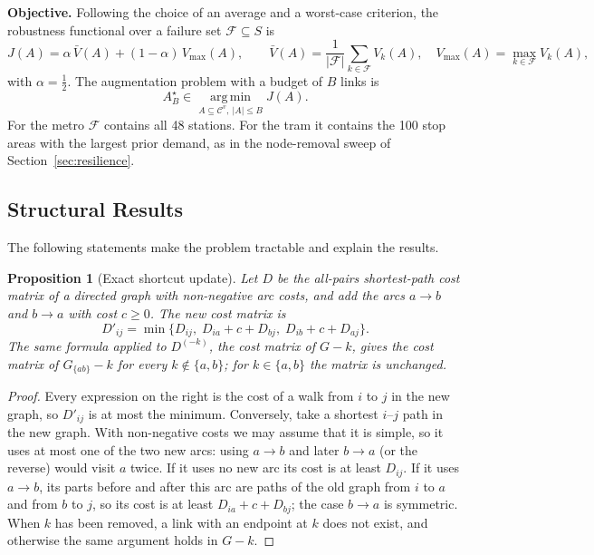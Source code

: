 \documentclass[12pt,a4paper]{article}
\theoremstyle{plain}
\newtheorem{proposition}[theorem]{Proposition}
\theoremstyle{definition}
\theoremstyle{remark}
\begin{document}
\textbf{Objective.}  Following the choice of an average and a worst-case
criterion, the robustness functional over a failure set $\mathcal F\subseteq S$
is
\begin{equation}
  J(A)=\alpha\,\bar V(A)+(1-\alpha)\,V_{\max}(A),\qquad
  \bar V(A)=\frac{1}{|\mathcal F|}\sum_{k\in\mathcal F}V_k(A),\quad
  V_{\max}(A)=\max_{k\in\mathcal F}V_k(A),
  \label{eq:J}
\end{equation}
with $\alpha=\tfrac12$.  The augmentation problem with a budget of $B$ links is
\begin{equation}
  A^\star_B\in\operatorname*{arg\,min}_{A\subseteq\mathcal C^v,\ |A|\le B} J(A).
  \label{eq:augprob}
\end{equation}
For the metro $\mathcal F$ contains all 48 stations.  For the tram it contains
the 100 stop areas with the largest prior demand, as in the node-removal sweep
of Section~\ref{sec:resilience}.

\subsection{Structural Results}

The following statements make the problem tractable and explain the results.

\begin{proposition}[Exact shortcut update]
\label{prop:shortcut}
Let $D$ be the all-pairs shortest-path cost matrix of a directed graph with
non-negative arc costs, and add the arcs $a\to b$ and $b\to a$ with cost
$c\ge0$.  The new cost matrix is
\begin{equation}
  D'_{ij}=\min\bigl\{D_{ij},\;D_{ia}+c+D_{bj},\;D_{ib}+c+D_{aj}\bigr\}.
  \label{eq:shortcut}
\end{equation}
The same formula applied to $D^{(-k)}$, the cost matrix of $G-k$, gives the cost
matrix of $G_{\{ab\}}-k$ for every $k\notin\{a,b\}$; for $k\in\{a,b\}$ the matrix
is unchanged.
\end{proposition}

\begin{proof}
Every expression on the right is the cost of a walk from $i$ to $j$ in the new
graph, so $D'_{ij}$ is at most the minimum.  Conversely, take a shortest
$i$--$j$ path in the new graph.  With non-negative costs we may assume that it
is simple, so it uses at most one of the two new arcs: using $a\to b$ and later
$b\to a$ (or the reverse) would visit $a$ twice.  If it uses no new arc its cost
is at least $D_{ij}$.  If it uses $a\to b$, its parts before and after this arc
are paths of the old graph from $i$ to $a$ and from $b$ to $j$, so its cost is
at least $D_{ia}+c+D_{bj}$; the case $b\to a$ is symmetric.  When $k$ has been
removed, a link with an endpoint at $k$ does not exist, and otherwise the same
argument holds in $G-k$.
\end{proof}
\end{document}
